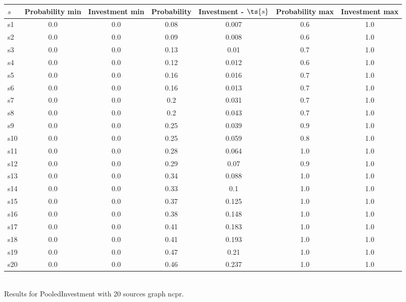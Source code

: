 \documentclass{article}
\begin{document}
\noindent\begin{tabular}{|l|c|c|c|c|c|c|}
\hline
$s$& Probability min & Investment min & Probability & Investment - $\ts{s}$ & Probability max & Investment max\\
\hline
s1 &0.0 & 0.0 & 0.08 & 0.007 & 0.6 & 1.0\\
\hline
s2 &0.0 & 0.0 & 0.09 & 0.008 & 0.6 & 1.0\\
\hline
s3 &0.0 & 0.0 & 0.13 & 0.01 & 0.7 & 1.0\\
\hline
s4 &0.0 & 0.0 & 0.12 & 0.012 & 0.6 & 1.0\\
\hline
s5 &0.0 & 0.0 & 0.16 & 0.016 & 0.7 & 1.0\\
\hline
s6 &0.0 & 0.0 & 0.16 & 0.013 & 0.7 & 1.0\\
\hline
s7 &0.0 & 0.0 & 0.2 & 0.031 & 0.7 & 1.0\\
\hline
s8 &0.0 & 0.0 & 0.2 & 0.043 & 0.7 & 1.0\\
\hline
s9 &0.0 & 0.0 & 0.25 & 0.039 & 0.9 & 1.0\\
\hline
s10 &0.0 & 0.0 & 0.25 & 0.059 & 0.8 & 1.0\\
\hline
s11 &0.0 & 0.0 & 0.28 & 0.064 & 1.0 & 1.0\\
\hline
s12 &0.0 & 0.0 & 0.29 & 0.07 & 0.9 & 1.0\\
\hline
s13 &0.0 & 0.0 & 0.34 & 0.088 & 1.0 & 1.0\\
\hline
s14 &0.0 & 0.0 & 0.33 & 0.1 & 1.0 & 1.0\\
\hline
s15 &0.0 & 0.0 & 0.37 & 0.125 & 1.0 & 1.0\\
\hline
s16 &0.0 & 0.0 & 0.38 & 0.148 & 1.0 & 1.0\\
\hline
s17 &0.0 & 0.0 & 0.41 & 0.183 & 1.0 & 1.0\\
\hline
s18 &0.0 & 0.0 & 0.41 & 0.193 & 1.0 & 1.0\\
\hline
s19 &0.0 & 0.0 & 0.47 & 0.21 & 1.0 & 1.0\\
\hline
s20 &0.0 & 0.0 & 0.46 & 0.237 & 1.0 & 1.0\\
\hline
\end{tabular}\\

\noindent Results for PooledInvestment with 20 sources graph ncpr.
\end{document}
